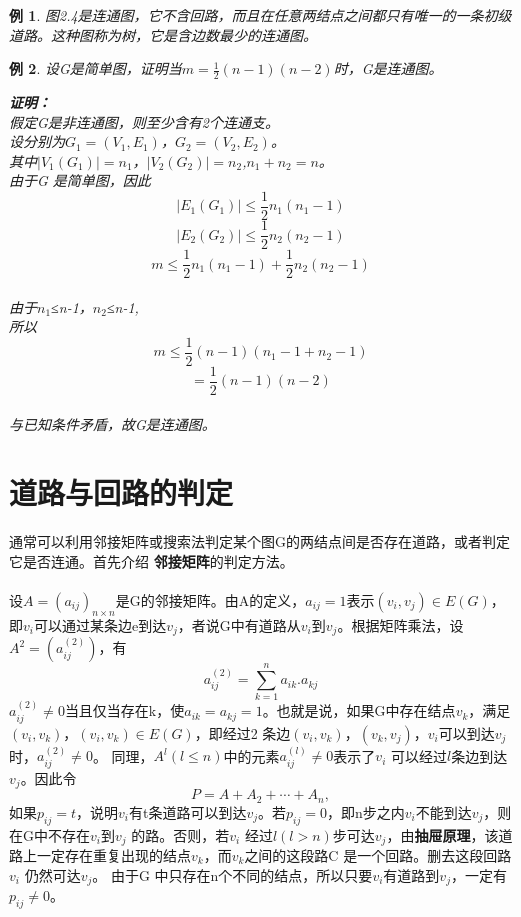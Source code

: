 \documentclass[11pt,a4paper,openany]{book}
\newtheorem{sample}{\textbf{例}}[section]
\begin{document}
\begin{sample}\K
图2.4是连通图，它不含回路，而且在任意两结点之间都只有唯一的一条初级道路。这种图称为树，它是含边数最少的连通图。
\end{sample}
\begin{sample}\K
设G是简单图，证明当$m=\frac{1}{2}(n-1)(n-2)$时，G是连通图。\\
\begin{adjustwidth}{0.62cm}{0.62cm}
\textbf{证明：}\\
假定G是非连通图，则至少含有2个连通支。\\
设分别为$G_1=(V_1,E_1)$，$G_2=(V_2,E_2)$。\\
其中$|V_1 (G_1 )|=n_1$，$|V_2 (G_2 )|=n_2$,$n_1+n_2=n$。\\
由于G 是简单图，因此$$|E_1 (G_1 )|\leq\frac{1}{2} n_1(n_1-1)$$$$|E_2 (G_2 )|\leq\frac{1}{2}n_2 (n_2-1)$$$$m\leq\frac{1}{2} n_1(n_1-1)+\frac{1}{2}n_2(n_2-1)$$\\
由于$n_1$≤n-1，$n_2$≤n-1,\\
所以$$m\leq\frac{1}{2}(n-1)(n_1-1+n_2-1)$$$$=\frac{1}{2}(n-1)(n-2)$$\\
与已知条件矛盾，故G是连通图。\\
\end{adjustwidth}
\end{sample}

\section{道路与回路的判定}
\paragraph{}通常可以利用邻接矩阵或搜索法判定某个图G的两结点间是否存在道路，或者判定它是否连通。首先介绍\textbf{ 邻接矩阵}的判定方法。
\paragraph{}设$A=(a_{ij})_{n\times n}$是G的邻接矩阵。由A的定义，$a_{ij}=1$表示$(v_i,v_j )\in E(G)$，即$v_i$可以通过某条边e到达$v_j$，者说G中有道路从$v_i$到$v_j$。根据矩阵乘法，设$A^2=(a_{ij}^{(2)})$，有
\begin{displaymath}
a_{ij}^{(2)}=\sum_{k=1}^{n}a_{ik}.a_{kj}
\end{displaymath}
$a_{ij}^{(2)}\neq 0$当且仅当存在k，使$a_{ik}=a_{kj}=1$。也就是说，如果G中存在结点$v_k$，满足$(v_i,v_k )$，$(v_i,v_k )\in E(G)$，即经过2 条边$(v_i,v_k)$，$(v_k,v_j)$，$v_i$可以到达$v_j$时，$a_{ij}^{(2)}\neq 0$。 同理，$A^l(l≤n)$中的元素$a_{ij}^{(l)}\neq0$表示了$v_i$ 可以经过$l$条边到达$v_j$。因此令$$P=A+A_2+\cdots+A_n,$$如果$p_{ij}=t$，说明$v_i$有t条道路可以到达$v_j$。若$p_{ij}=0$，即n步之内$v_i$不能到达$v_j$，则在G中不存在$v_i$到$v_j$ 的路。否则，若$v_i$ 经过$l(l>n)$步可达$v_j$，由\textbf{抽屉原理}，该道路上一定存在重复出现的结点$v_k$，而$v_k$之间的这段路C 是一个回路。删去这段回路$v_i$ 仍然可达$v_j$。 由于G 中只存在n个不同的结点，所以只要$v_i$有道路到$v_j$，一定有$p_{ij}≠0$。
\end{document}
